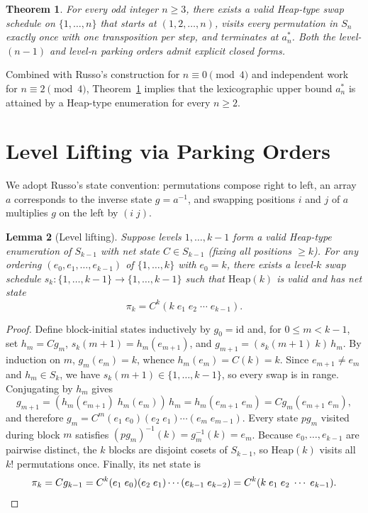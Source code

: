 \documentclass[11pt]{article}
\newtheorem{theorem}{Theorem}
\newtheorem{lemma}[theorem]{Lemma}
\begin{document}
\begin{theorem}\label{thm:main}
For every odd integer $n \ge 3$, there exists a valid Heap-type swap schedule on
$\{1,\dots,n\}$ that starts at $(1,2,\dots,n)$, visits every permutation in
$S_n$ exactly once with one transposition per step, and terminates at $a^*_n$.
Both the level-$(n-1)$ and level-$n$ parking orders admit explicit closed forms.
\end{theorem}

Combined with Russo's construction for $n \equiv 0 \pmod 4$ and independent work
for $n \equiv 2 \pmod 4$, Theorem~\ref{thm:main} implies that the lexicographic
upper bound $a^*_n$ is attained by a Heap-type enumeration for every $n \ge 2$.

\section{Level Lifting via Parking Orders}

We adopt Russo's state convention: permutations compose right to left, an array
$a$ corresponds to the inverse state $g = a^{-1}$, and swapping positions $i$
and $j$ of $a$ multiplies $g$ on the left by $(i\;j)$.

\begin{lemma}[Level lifting]\label{lem:lift}
Suppose levels $1,\dots,k-1$ form a valid Heap-type enumeration of $S_{k-1}$
with net state $C \in S_{k-1}$ (fixing all positions $\ge k$). For any ordering
$(e_0, e_1, \dots, e_{k-1})$ of $\{1,\dots,k\}$ with $e_0 = k$, there exists a
level-$k$ swap schedule $s_k : \{1,\dots,k-1\} \to \{1,\dots,k-1\}$ such that
$\mathrm{Heap}(k)$ is valid and has net state
\[
\pi_k = C^k (k\; e_1\; e_2\; \cdots\; e_{k-1}).
\]
\end{lemma}

\begin{proof}
Define block-initial states inductively by $g_0 = \mathrm{id}$ and, for
$0 \le m < k-1$, set $h_m = C g_m$, $s_k(m+1) = h_m(e_{m+1})$, and
$g_{m+1} = (s_k(m+1)\;k)\,h_m$. By induction on $m$, $g_m(e_m) = k$, whence
$h_m(e_m) = C(k) = k$. Since $e_{m+1} \neq e_m$ and $h_m \in S_k$, we have
$s_k(m+1) \in \{1,\dots,k-1\}$, so every swap is in range. Conjugating by $h_m$
gives
\[
g_{m+1} = (h_m(e_{m+1})\; h_m(e_m))\, h_m = h_m (e_{m+1}\;e_m) = C g_m (e_{m+1}\;e_m),
\]
and therefore $g_m = C^m (e_1\;e_0)(e_2\;e_1)\cdots(e_m\;e_{m-1})$. Every state
$p g_m$ visited during block $m$ satisfies $(p g_m)^{-1}(k) = g_m^{-1}(k) = e_m$.
Because $e_0,\dots,e_{k-1}$ are pairwise distinct, the $k$ blocks are disjoint
cosets of $S_{k-1}$, so $\mathrm{Heap}(k)$ visits all $k!$ permutations once.
Finally, its net state is
\[
\pi_k = C g_{k-1} = C^k (e_1\;e_0)(e_2\;e_1)\cdots(e_{k-1}\;e_{k-2})
= C^k (k\; e_1\; e_2\; \cdots\; e_{k-1}). \qedhere
\]
\end{proof}
\end{document}
